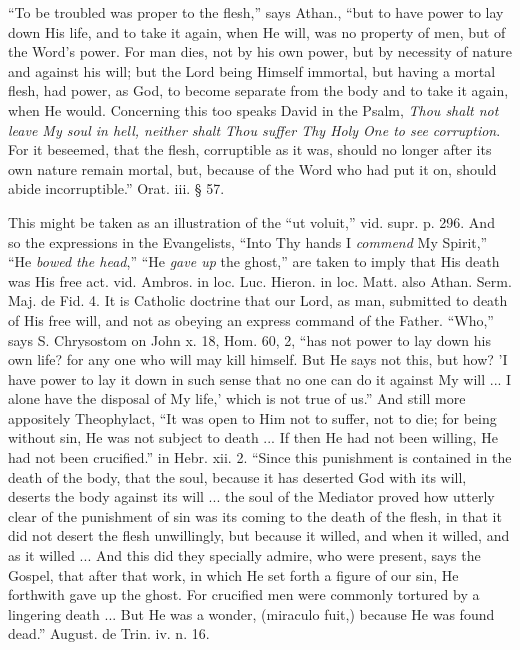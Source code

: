 ``To be troubled was proper to the flesh,'' says
Athan., ``but to have power to lay down His life, and to take it again,
when He will, was no property of men, but of the Word's power. For man
dies, not by his own power, but by necessity of nature and
against his will; but the Lord being Himself immortal, but having a
mortal flesh, had power, as God, to become separate from the body and
to take it again, when He would. Concerning this too speaks David in
the Psalm, \emph{Thou shalt not leave My soul in hell, neither shalt Thou
suffer Thy Holy One to see corruption}. For it beseemed, that the
flesh, corruptible as it was, should no longer after its own nature
remain mortal, but, because of the Word who had put it on, should
abide incorruptible.'' Orat. iii. § 57.

This might be taken as an illustration of the ``ut
voluit,'' vid. supr. p. 296. And so the expressions in the Evangelists,
``Into Thy hands I \emph{commend} My Spirit,'' ``He \emph{bowed the head},''
``He \emph{gave up} the ghost,'' are taken to imply that His death was
His free act. vid. Ambros. in loc. Luc. Hieron. in loc. Matt. also
Athan. Serm. Maj. de Fid. 4. It is Catholic doctrine that our Lord, as
man, submitted to death of His free will, and not as obeying an
express command of the Father. ``Who,'' says S. Chrysostom on John x.
18, Hom. 60, 2, ``has not power to lay down his own life? for any one
who will may kill himself. But He says not this, but how? 'I have
power to lay it down in such sense that no one can do it against My
will ... I alone have the disposal of My life,' which is not true of
us.'' And still more appositely Theophylact, ``It was open to Him not to
suffer, not to die; for being without sin, He was not subject to death
... If then He had not been willing, He had not been crucified.'' in
Hebr. xii. 2. ``Since this punishment is contained in the death
of the body, that the soul, because it has deserted God with its will,
deserts the body against its will ... the soul of the Mediator proved
how utterly clear of the punishment of sin was its coming to the death
of the flesh, in that it did not desert the flesh unwillingly, but
because it willed, and when it willed, and as it willed ... And this
did they specially admire, who were present, says the Gospel, that
after that work, in which He set forth a figure of our sin, He
forthwith gave up the ghost. For crucified men were commonly tortured
by a lingering death ... But He was a wonder, (miraculo fuit,) because
He was found dead.'' August. de Trin. iv. n. 16.

